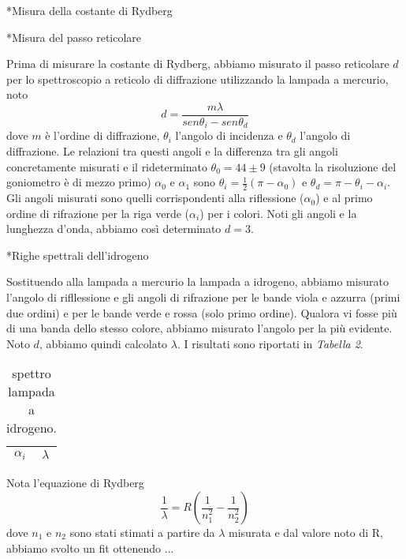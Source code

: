 \begin{section}*{Misura della costante di Rydberg}

\begin{subsection}*{Misura del passo reticolare}

Prima di misurare la costante di Rydberg, abbiamo misurato il passo reticolare $d$ per lo spettroscopio a reticolo di diffrazione utilizzando la lampada a mercurio, noto $$d = \frac{m\lambda}{sen\theta_{i} - sen\theta_{d}}$$ dove $m$ è l'ordine di diffrazione, $\theta_{i}$ l'angolo di incidenza e $\theta_{d}$ l'angolo di diffrazione. Le relazioni tra questi angoli e la differenza tra gli angoli concretamente misurati e il rideterminato $\theta_{0} = 44 \pm 9$ (stavolta la risoluzione del goniometro è di mezzo primo) $\alpha_{0}$ e $\alpha_{1}$ sono $\theta_{i} = \frac{1}{2} (\pi - \alpha_{0})$ e $\theta_{d} = \pi - \theta_{i} - \alpha_{i}$.\\  Gli angoli misurati sono quelli corrispondenti alla riflessione ($\alpha_{0}$) e al primo ordine di rifrazione per la riga verde ($\alpha_{i}$) per i colori. Noti gli angoli e la lunghezza d'onda, abbiamo così determinato $d = 3$.

\end{subsection}

\begin{subsection}*{Righe spettrali dell'idrogeno}

Sostituendo alla lampada a mercurio la lampada a idrogeno, abbiamo misurato l'angolo di rifllessione e gli angoli di rifrazione per le bande viola e azzurra (primi due ordini) e per le bande verde e rossa (solo primo ordine). Qualora vi fosse più di una banda dello stesso colore, abbiamo misurato l'angolo per la più evidente. Noto $d$, abbiamo quindi calcolato $\lambda$. I risultati sono riportati in \emph{Tabella 2}.\\

\begin{table}[h]
\begin{center}
\begin{tabular}{| r @{$\pm$} l  @{ Rad } | r @{$\pm$} l  @{\quad nm } |}

\hline
\multicolumn{2}{c|}{$\alpha_{i}$} & \multicolumn{2}{c|}{$\lambda$} \\
\hline

\hline

\end{tabular}
\caption{spettro lampada a idrogeno.}
\end{center}
\end{table}

Nota l'equazione di Rydberg $$ \frac{1}{\lambda} = R (\frac{1}{n_{1}^2} - \frac{1}{n_{2}^2}) $$ dove $n_1$ e $n_2$ sono stati stimati a partire da $\lambda$ misurata e dal valore noto di R, abbiamo svolto un fit ottenendo ...\\

\end{subsection}


\end{section}